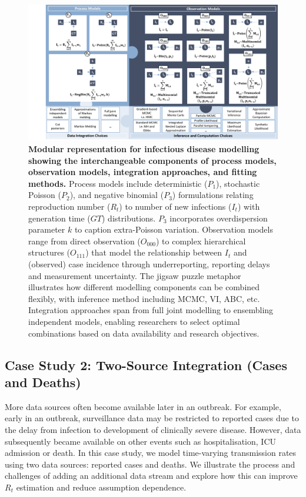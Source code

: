 \documentclass{article}
\begin{document}
 


\begin{figure}[htbp]
    \centering
    \includegraphics[width=\textwidth]{figures/case_study_puzzle_complete.png}
    \caption{\textbf{Modular representation for infectious disease modelling showing the interchangeable components of process models, observation models, integration approaches, and fitting methods.} Process models include deterministic ($P_1$), stochastic Poisson ($P_2$), and negative binomial ($P_3$) formulations relating reproduction number ($R_t$) to number of new infections ($I_t$) with generation time ($GT$) distributions. $P_3$ incorporates overdispersion parameter $k$ to caption extra-Poisson variation. Observation models range from direct observation ($O_{000}$) to complex hierarchical structures ($O_{111}$) that model the relationship between $I_t$ and (observed) case incidence through underreporting, reporting delays and measurement uncertainty. The jigsaw puzzle metaphor illustrates how different modelling components can be combined flexibly, with inference method including MCMC, VI, ABC, etc. Integration approaches span from full joint modelling to ensembling independent models, enabling researchers to select optimal combinations based on data availability and research objectives. }
    \label{fig:case_study_visual}
\end{figure}


\subsection{Case Study 2: Two-Source Integration (Cases and Deaths)}

More data sources often become available later in an outbreak. For example, early in an outbreak, surveillance data may be restricted to reported cases due to the delay from infection to development of clinically severe disease. However, data subsequently became available on other events such as hospitalisation, ICU admission or death. In this case study, we model time-varying transmission rates using two data sources: reported cases and deaths. We illustrate the process and challenges of adding an additional data stream and explore how this can improve $R_t$ estimation and reduce assumption dependence.
\end{document}
